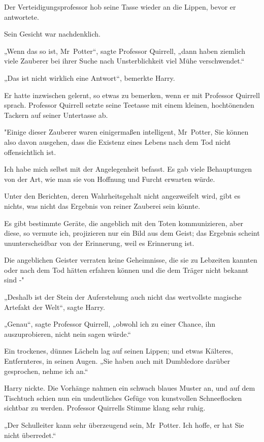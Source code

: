 {Der Verteidigungsprofessor hob seine Tasse wieder an die Lippen, bevor er antwortete.

Sein Gesicht war nachdenklich.

„Wenn das so ist, Mr~Potter“, sagte Professor Quirrell, „dann haben ziemlich viele Zauberer bei ihrer Suche nach Unsterblichkeit viel Mühe verschwendet.“

„Das ist nicht wirklich eine Antwort“, bemerkte Harry.

Er hatte inzwischen gelernt, so etwas zu bemerken, wenn er mit Professor Quirrell sprach. Professor Quirrell setzte seine Teetasse mit einem kleinen, hochtönenden Tackern auf seiner Untertasse ab.

"Einige dieser Zauberer waren einigermaßen intelligent, Mr~Potter, Sie können also davon ausgehen, dass die Existenz eines Lebens nach dem Tod nicht offensichtlich ist.

Ich habe mich selbst mit der Angelegenheit befasst. Es gab viele Behauptungen von der Art, wie man sie von Hoffnung und Furcht erwarten würde.

Unter den Berichten, deren Wahrheitsgehalt nicht angezweifelt wird, gibt es nichts, was nicht das Ergebnis von reiner Zauberei sein könnte.

Es gibt bestimmte Geräte, die angeblich mit den Toten kommunizieren, aber diese, so vermute ich, projizieren nur ein Bild aus dem Geist; das Ergebnis scheint ununterscheidbar von der Erinnerung, weil es Erinnerung ist.

Die angeblichen Geister verraten keine Geheimnisse, die sie zu Lebzeiten kannten oder nach dem Tod hätten erfahren können und die dem Träger nicht bekannt sind -"

„Deshalb ist der Stein der Auferstehung auch nicht das wertvollste magische Artefakt der Welt“, sagte Harry.

„Genau“, sagte Professor Quirrell, „obwohl ich zu einer Chance, ihn auszuprobieren, nicht nein sagen würde.“

Ein trockenes, dünnes Lächeln lag auf seinen Lippen; und etwas Kälteres, Entfernteres, in seinen Augen. „Sie haben auch mit Dumbledore darüber gesprochen, nehme ich an.“

Harry nickte. Die Vorhänge nahmen ein schwach blaues Muster an, und auf dem Tischtuch schien nun ein undeutliches Gefüge von kunstvollen Schneeflocken sichtbar zu werden. Professor Quirrells Stimme klang sehr ruhig.

„Der Schulleiter kann sehr überzeugend sein, Mr~Potter. Ich hoffe, er hat Sie nicht überredet.“

}
